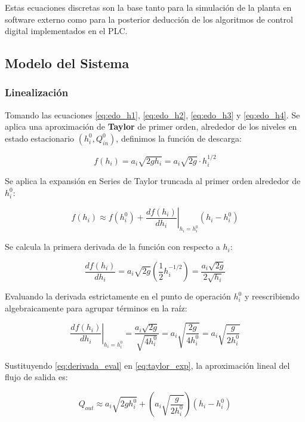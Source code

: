 Estas ecuaciones discretas son la base tanto para la simulación de la planta en software externo como para la posterior deducción de los algoritmos de control digital implementados en el PLC.

\subsection{Modelo del Sistema}
\subsubsection{Linealización}
Tomando las ecuaciones \ref{eq:edo_h1}, \ref{eq:edo_h2}, \ref{eq:edo_h3} y \ref{eq:edo_h4}. Se aplica una aproximación de \textbf{Taylor} de primer orden, alrededor de los niveles en estado estacionario $(h_i^0, Q_{in}^0)$, definimos la función de descarga:

\begin{equation}
f(h_i) = a_i \sqrt{2g h_i} = a_i \sqrt{2g} \cdot h_i^{1/2}
\label{eq:func_descarga}
\end{equation}

Se aplica la expansión en Series de Taylor truncada al primer orden alrededor de $h_i^0$:

\begin{equation}
f(h_i) \approx f(h_i^0) + \left. \frac{df(h_i)}{dh_i} \right|_{h_i = h_i^0} (h_i - h_i^0)
\label{eq:taylor_exp}
\end{equation}

Se calcula la primera derivada de la función con respecto a $h_i$:

\begin{equation}
\frac{df(h_i)}{dh_i} = a_i \sqrt{2g} \left( \frac{1}{2} h_i^{-1/2} \right) = \frac{a_i \sqrt{2g}}{2\sqrt{h_i}}
\label{eq:derivada_f}
\end{equation}

Evaluando la derivada estrictamente en el punto de operación $h_i^0$ y reescribiendo algebraicamente para agrupar términos en la raíz:

\begin{equation}
\left. \frac{df(h_i)}{dh_i} \right|_{h_i = h_i^0} = \frac{a_i \sqrt{2g}}{\sqrt{4 h_i^0}} = a_i \sqrt{\frac{2g}{4 h_i^0}} = a_i \sqrt{\frac{g}{2 h_i^0}}
\label{eq:derivada_eval}
\end{equation}

Sustituyendo \eqref{eq:derivada_eval} en \eqref{eq:taylor_exp}, la aproximación lineal del flujo de salida es:

\begin{equation}
Q_{out} \approx a_i \sqrt{2g h_i^0} + \left( a_i \sqrt{\frac{g}{2 h_i^0}} \right) (h_i - h_i^0)
\label{eq:qout_aprox}
\end{equation}


